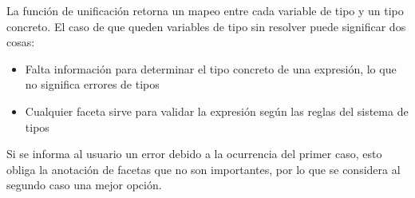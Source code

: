 La función de unificación retorna un mapeo entre cada variable de tipo y un tipo concreto. El caso de que queden variables de tipo sin resolver puede significar dos cosas:

\begin{itemize}
  \item Falta información para determinar el tipo concreto de una expresión, lo que no significa errores de tipos
  \item Cualquier faceta sirve para validar la expresión según las reglas del sistema de tipos
\end{itemize}

Si se informa al usuario un error debido a la ocurrencia del primer caso, esto obliga la anotación de facetas que no son importantes, por lo que se considera al segundo caso una mejor opción.
